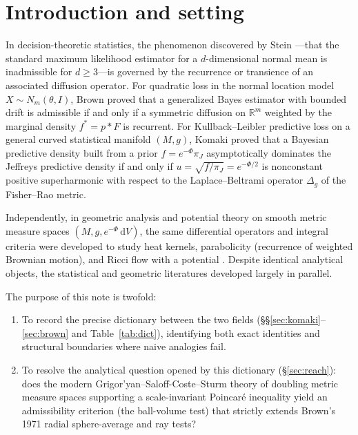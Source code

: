\documentclass[a4paper,11pt,noarxiv]{quantumarticle}
\newcommand{\R}{\mathbb{R}}
\newcommand{\dd}{\,\mathrm{d}}
\theoremstyle{plain}
\theoremstyle{definition}
\theoremstyle{remark}
\begin{document}
\section{Introduction and setting}\label{sec:intro}

In decision-theoretic statistics, the phenomenon discovered by Stein
\cite{stein1956}---that the standard maximum likelihood estimator for a
$d$-dimensional normal mean is inadmissible for $d\ge3$---is governed
by the recurrence or transience of an associated diffusion operator.
For quadratic loss in the normal location model $X\sim N_m(\theta,I)$,
Brown \cite{brown1971} proved that a generalized Bayes estimator with
bounded drift is admissible if and only if a symmetric diffusion on
$\R^m$ weighted by the marginal density $f^*=p*F$ is recurrent. For
Kullback--Leibler predictive loss on a general curved statistical
manifold $(M,g)$, Komaki \cite{komaki2006} proved that a Bayesian
predictive density built from a prior $f=e^{-\Phi}\pi_J$ asymptotically
dominates the Jeffreys predictive density if and only if
$u=\sqrt{f/\pi_J}=e^{-\Phi/2}$ is nonconstant positive superharmonic
with respect to the Laplace--Beltrami operator $\Delta_g$ of the
Fisher--Rao metric.

Independently, in geometric analysis and potential theory on smooth
metric measure spaces $(M,g,e^{-\Phi}\dd V)$, the same differential
operators and integral criteria were developed to study heat kernels,
parabolicity (recurrence of weighted Brownian motion), and Ricci flow
with a potential \cite{bakryemery1985,grigoryan1999,perelman2002}.
Despite identical analytical objects, the statistical and geometric
literatures developed largely in parallel.

The purpose of this note is twofold:
\begin{enumerate}[label=\textup{(\roman*)},leftmargin=2em,itemsep=2pt]
\item To record the precise dictionary between the two fields
(\S\S\ref{sec:komaki}--\ref{sec:brown} and Table~\ref{tab:dict}),
identifying both exact identities and structural boundaries where naive
analogies fail.
\item To resolve the analytical question opened by this dictionary
(\S\ref{sec:reach}): does the modern Grigor'yan--Saloff-Coste--Sturm
theory of doubling metric measure spaces supporting a scale-invariant
Poincar\'e inequality yield an admissibility criterion (the ball-volume
test) that strictly extends Brown's 1971 radial sphere-average and
ray tests?
\end{enumerate}
\end{document}
